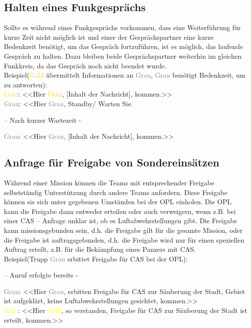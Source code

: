 \subsection{Halten eines Funkgesprächs}
Sollte es während eines Funkgesprächs vorkommen, dass eine Weiterführung für kurze Zeit nicht möglich ist und einer der Gesprächspartner eine kurze Bedenkzeit benötigt, um das Gespräch fortzuführen, ist es möglich, das laufende Gespräch zu halten. Dazu bleiben beide Gesprächspartner weiterhin im gleichen Funkkreis, da das Gespräch noch nicht beendet wurde. \\
Beispiel(\textcolor{gold}{Gold} übermittelt Informationen an \textcolor{gray}{Grau}, \textcolor{gray}{Grau} benötigt Bedenkzeit, um zu antworten): \\
\textcolor{gold}{Gold}: <<Hier \textcolor{gold}{Gold}, [Inhalt der Nachricht], kommen.>> \\
\textcolor{gray}{Grau}: <<Hier \textcolor{gray}{Grau}, Standby/ Warten Sie. \\
\begin{center}
– Nach kurzer Wartezeit - \\
\end{center}
\textcolor{gray}{Grau}: <<Hier \textcolor{gray}{Grau}, [Inhalt der Nachricht], kommen.>> \\

\subsection{Anfrage für Freigabe von Sondereinsätzen}
Während einer Mission können die Teams mit entsprechender Freigabe selbstständig Unterstützung durch andere Teams anfordern. Diese Freigabe können sie sich unter gegebenen Umständen bei der OPL einholen. Die OPL kann die Freigabe dann entweder erteilen oder auch verweigern, wenn z.B. bei einer CAS – Anfrage unklar ist, ob es Luftabwehrstellungen gibt. Die Freigabe kann missionsgebunden sein, d.h. die Freigabe gilt für die gesamte Mission, oder die Freigabe ist auftragsgebunden, d.h. die Freigabe wird nur für einen speziellen Auftrag erteilt, z.B. für die Bekämpfung eines Panzers mit CAS. \\
Beispiel(Trupp \textcolor{gray}{Grau} erbittet Freigabe für CAS bei der OPL): \\
\begin{center}
– Anruf erfolgte bereits -
\end{center}
\textcolor{gray}{Grau}: <<Hier \textcolor{gray}{Grau}, erbitten Freigabe für CAS zur Säuberung der Stadt, Gebiet ist aufgeklärt, keine Luftabwehrstellungen gesichtet, kommen.>> \\
\textcolor{yellow}{Gelb}: <<Hier \textcolor{yellow}{Gelb}, so verstanden, Freigabe für CAS zur Säuberung der Stadt ist erteilt, kommen.>>\\

